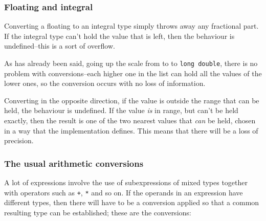    

   \subsubsection{Floating and integral}
    

    Converting a floating to an integral type simply throws away any
     fractional part. If the integral type can't hold the value that is left,
     then the behaviour is undefined--this is a sort of overflow.


    As has already been said, going up the scale from \float{} to
     \double{} to \texttt{long double}, there is no problem with
     conversions--each higher one in the list can hold all the values of
     the lower ones, so the conversion occurs with no loss of information.


    Converting in the opposite direction, if the value is outside the range
     that can be held, the behaviour is undefined. If the value \textit{is} in
     range, but can't be held exactly, then the result is one of the two
     nearest values that \textit{can} be held, chosen in a way that the
     implementation defines. This means that there will be a loss of
     precision.


   

   \subsubsection{The usual arithmetic conversions}
    

    A lot of expressions involve the use of subexpressions of mixed types
     together with operators such as \texttt{+}, \texttt{*} and
     so on. If the operands in an expression have different types, then there
     will have to be a conversion applied so that a common resulting type can
     be established; these are the conversions:


